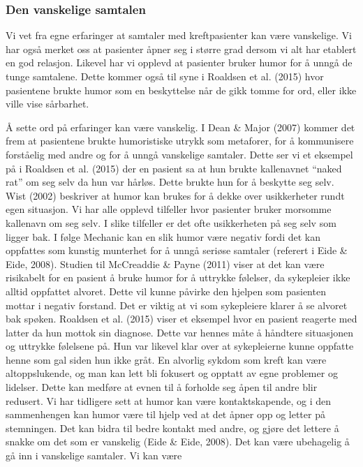 \subsubsection{Den vanskelige samtalen}

Vi vet fra egne erfaringer at samtaler med kreftpasienter kan være vanskelige.
Vi har også merket oss at pasienter åpner seg i større grad dersom vi alt har
etablert en god relasjon. Likevel har vi opplevd at pasienter bruker humor for
å unngå de tunge samtalene. Dette kommer også til syne i Roaldsen et al. (2015)
hvor pasientene brukte humor som en beskyttelse når de gikk tomme for ord,
eller ikke ville vise sårbarhet.

Å sette ord på erfaringer kan være vanskelig. I Dean \&{} Major (2007) kommer det
frem at pasientene brukte humoristiske utrykk som metaforer, for å kommunisere
forståelig med andre og for å unngå vanskelige samtaler. Dette ser vi et
eksempel på i Roaldsen et al. (2015) der en pasient sa at hun brukte
kallenavnet “naked rat” om seg selv da hun var hårløs. Dette brukte hun for å
beskytte seg selv. Wist (2002) beskriver at humor kan brukes for å dekke over
usikkerheter rundt egen situasjon. Vi har alle opplevd tilfeller hvor pasienter
bruker morsomme kallenavn om seg selv. I slike tilfeller er det ofte
usikkerheten på seg selv som ligger bak. I følge Mechanic kan en slik humor
være negativ fordi det kan oppfattes som kunstig munterhet for å unngå seriøse
samtaler (referert i Eide \&{} Eide, 2008). Studien til McCreaddie \&{} Payne (2011)
viser at det kan være risikabelt for en pasient å bruke humor for å uttrykke
følelser, da sykepleier ikke alltid oppfattet alvoret. Dette vil kunne påvirke
den hjelpen som pasienten mottar i negativ forstand. Det er viktig at vi som
sykepleiere klarer å se alvoret bak spøken. Roaldsen et al. (2015) viser et
eksempel hvor en pasient reagerte med latter da hun mottok sin diagnose. Dette
var hennes måte å håndtere situasjonen og uttrykke følelsene på. Hun var
likevel klar over at sykepleierne kunne oppfatte henne som gal siden hun ikke
gråt.  En alvorlig sykdom som kreft kan være altoppslukende, og man kan lett
bli fokusert og opptatt av egne problemer og lidelser. Dette kan medføre at
evnen til å forholde seg åpen til andre blir redusert. Vi har tidligere sett at
humor kan være kontaktskapende, og i den sammenhengen kan humor være til hjelp
ved at det åpner opp og letter på stemningen. Det kan bidra til bedre kontakt
med andre, og gjøre det lettere å snakke om det som er vanskelig (Eide \&{} Eide,
2008).  Det kan være ubehagelig å gå inn i vanskelige samtaler. Vi kan være
